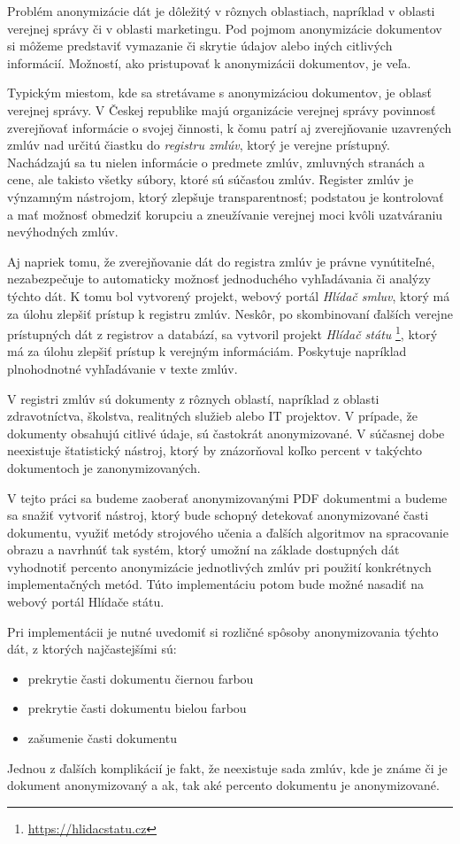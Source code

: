 \label{chap:intro}
Problém anonymizácie dát je dôležitý v rôznych oblastiach, napríklad v oblasti verejnej správy či
v oblasti marketingu. Pod pojmom anonymizácie dokumentov si môžeme predstaviť vymazanie či skrytie údajov 
alebo iných citlivých informácií. Možností, ako pristupovať k anonymizácii dokumentov, je veľa. 

Typickým miestom, kde sa stretávame s anonymizáciou dokumentov, je oblasť verejnej správy.
V Českej republike majú organizácie verejnej správy povinnosť zverejňovať informácie o svojej činnosti,
k čomu patrí aj zverejňovanie uzavrených zmlúv nad určitú čiastku do \textit{registru zmlúv}, 
ktorý je verejne prístupný. Nachádzajú sa tu nielen informácie o predmete zmlúv, zmluvných stranách a cene,
ale takisto všetky súbory, ktoré sú súčasťou zmlúv. Register zmlúv je výnzamným nástrojom, ktorý zlepšuje 
transparentnosť; podstatou je kontrolovať a mať možnosť obmedziť korupciu a zneužívanie verejnej moci 
kvôli uzatváraniu nevýhodných zmlúv.

Aj napriek tomu, že zverejňovanie dát do registra zmlúv je právne vynútiteľné, nezabezpečuje to automaticky
možnosť jednoduchého vyhľadávania či analýzy týchto dát. K tomu bol vytvorený projekt, webový portál 
\textit{Hlídač smluv}, ktorý má za úlohu zlepšiť prístup k registru zmlúv. Neskôr, po skombinovaní ďalších 
verejne prístupných dát z registrov a databází, sa vytvoril projekt \textit{Hlídač státu}
\footnote{\url{https://hlidacstatu.cz}}, ktorý má za úlohu zlepšiť prístup k verejným informáciám. Poskytuje
napríklad plnohodnotné vyhľadávanie v texte zmlúv.

V registri zmlúv sú dokumenty z rôznych oblastí, napríklad z oblasti zdravotníctva, školstva, realitných služieb alebo
IT projektov. V prípade, že dokumenty obsahujú citlivé údaje, sú častokrát anonymizované. V súčasnej dobe neexistuje 
štatistický nástroj, ktorý by znázorňoval koľko percent v takýchto dokumentoch je zanonymizovaných.

V tejto práci sa budeme zaoberať anonymizovanými PDF dokumentmi a budeme sa snažiť vytvoriť nástroj, 
ktorý bude schopný detekovať anonymizované časti dokumentu, využiť metódy strojového učenia a ďalších algoritmov na 
spracovanie obrazu a navrhnúť tak systém, ktorý umožní na základe dostupných dát vyhodnotiť percento anonymizácie 
jednotlivých zmlúv pri použití konkrétnych implementačných metód.
Túto implementáciu potom bude možné nasadiť na webový portál Hlídače státu.

Pri implementácii je nutné uvedomiť si rozličné spôsoby anonymizovania týchto dát, z ktorých najčastejšími sú:
\begin{itemize}
    \item prekrytie časti dokumentu čiernou farbou
    \item prekrytie časti dokumentu bielou farbou
    \item zašumenie časti dokumentu
\end{itemize}
Jednou z ďalších komplikácií je fakt, že neexistuje sada zmlúv, kde je známe či je dokument anonymizovaný a ak, 
tak aké percento dokumentu je anonymizované.


